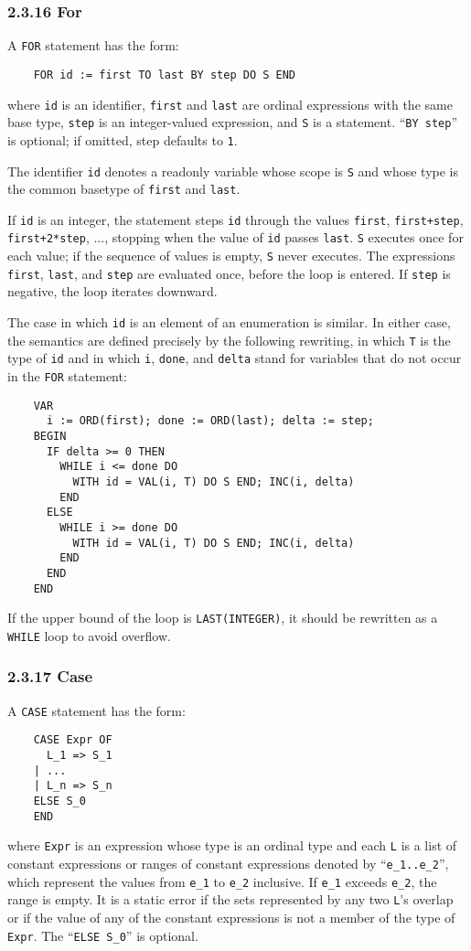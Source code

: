 \documentclass[10pt]{article}
\begin{document}
\subsubsection*{2.3.16 For}

A \verb|FOR| statement has the form:
\begin{verbatim}
    FOR id := first TO last BY step DO S END
\end{verbatim}
where \verb|id| is an identifier, \verb|first| and \verb|last| are ordinal
expressions with the same base type, \verb|step| is an integer-valued
expression, and \verb|S| is a statement.  ``\verb|BY step|'' is optional; if
omitted, step defaults to \verb|1|.

The identifier \verb|id| denotes a readonly variable whose scope is \verb|S|
and whose type is the common basetype of \verb|first| and \verb|last|.

If \verb|id| is an integer, the statement steps \verb|id| through the values
\verb|first|, \verb|first+step|, \verb|first+2*step|, ..., stopping when the
value of \verb|id| passes \verb|last|.  \verb|S| executes once for each value;
if the sequence of values is empty, \verb|S| never executes.  The expressions
\verb|first|, \verb|last|, and \verb|step| are evaluated once, before the loop
is entered.  If \verb|step| is negative, the loop iterates downward.

The case in which \verb|id| is an element of an enumeration is similar.  In
either case, the semantics are defined precisely by the following rewriting,
in which \verb|T| is the type of \verb|id| and in which \verb|i|, \verb|done|,
and \verb|delta| stand for variables that do not occur in the \verb|FOR|
statement:
\begin{verbatim}
    VAR
      i := ORD(first); done := ORD(last); delta := step;
    BEGIN
      IF delta >= 0 THEN
        WHILE i <= done DO
          WITH id = VAL(i, T) DO S END; INC(i, delta)
        END
      ELSE
        WHILE i >= done DO
          WITH id = VAL(i, T) DO S END; INC(i, delta)
        END
      END
    END
\end{verbatim}

If the upper bound of the loop is \verb|LAST(INTEGER)|, it should be rewritten
as a \verb|WHILE| loop to avoid overflow.

\subsubsection*{2.3.17 Case}

A \verb|CASE| statement has the form:
\begin{verbatim}
    CASE Expr OF
      L_1 => S_1
    | ...
    | L_n => S_n
    ELSE S_0
    END
\end{verbatim}
where \verb|Expr| is an expression whose type is an ordinal type and each
\verb|L| is a list of constant expressions or ranges of constant expressions
denoted by ``\verb|e_1..e_2|'', which represent the values from \verb|e_1| to
\verb|e_2| inclusive.  If \verb|e_1| exceeds \verb|e_2|, the range is empty.
It is a static error if the sets represented by any two \verb|L|'s overlap or
if the value of any of the constant expressions is not a member of the type of
\verb|Expr|.  The ``\verb|ELSE S_0|'' is optional.
\end{document}
